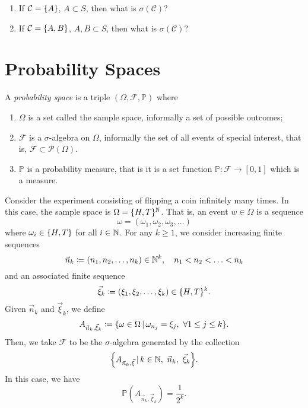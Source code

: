 \documentclass[12pt]{book}
\renewcommand{\F}{\mathcal F}
\renewcommand{\P}{\mathbb P}
\begin{document}
\begin{exercise} \skipline
\begin{enumerate}
\item If \( \mathcal C = \{A\} \), \( A \subset S \), then what is \( \sigma(\mathcal C) \)?
\item If \( \mathcal C = \{A, B\} \), \( A, B \subset S \), then what is \( \sigma(\mathcal C) \)?
\end{enumerate}
\end{exercise}





\section{Probability Spaces}

\begin{definition}
A \emph{probability space} is a triple \( (\Omega, \F, \P) \) where
\begin{enumerate}
\item \( \Omega \) is a set called the sample space, informally a set of possible outcomes;
\item \( \F \) is a \( \sigma \)-algebra on \( \Omega \), informally the set of all events of special interest, that is, \( \F \subset \mathcal P(\Omega) \).
\item \( \P \) is a probability measure, that is it is a set function \( \P : \F \to [0, 1] \) which is a measure.
\end{enumerate}
\end{definition}

\begin{example}
Consider the experiment consisting of flipping a coin infinitely many times.
In this case, the sample space is \( \Omega = \{H, T\}^{\mathbb{N}} \).
That is, an event \( w \in \Omega \) is a sequence
\[ \omega = (\omega_1, \omega_2, \omega_3, \ldots) \]
where \( \omega_i \in \{H, T\} \) for all \( i \in \mathbb{N} \).
For any \( k \geq 1 \), we consider increasing finite sequences
\[ \vec n_k \coloneqq (n_1, n_2, \ldots, n_k) \in \mathbb{N}^k, \quad n_1 < n_2 < \ldots < n_k \]
and an associated finite sequence
\[ \vec \xi_k \coloneqq (\xi_1, \xi_2, \ldots, \xi_k) \in \{H, T\}^k. \]
Given \( \vec n_k \) and \( \vec \xi_k \), we define
\[ A_{\vec n_k, \vec \xi_k} \coloneqq \set{\omega \in \Omega \given \omega_{n_j} = \xi_j,\ \forall 1 \leq j \leq k}. \]
Then, we take \( \F \) to be the \( \sigma \)-algebra generated by the collection
\[ \set*{A_{\vec n_k, \vec \xi} \given k \in \N,\ \vec n_k,\ \vec \xi_k}. \]
In this case, we have
\[ \P(A_{\vec n_k, \vec \xi_k}) = \frac 1 {2^k}. \]
\end{example}
\end{document}
